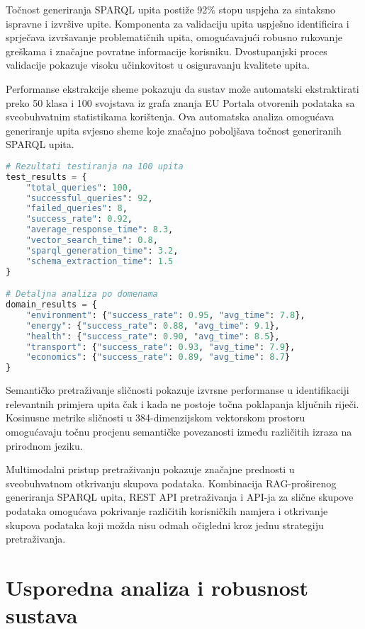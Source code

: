 Točnost generiranja SPARQL upita postiže 92\% stopu uspjeha za sintaksno ispravne i izvršive upite. Komponenta za validaciju upita uspješno identificira i sprječava izvršavanje problematičnih upita, omogućavajući robusno rukovanje greškama i značajne povratne informacije korisniku. Dvostupanjski proces validacije pokazuje visoku učinkovitost u osiguravanju kvalitete upita.

Performanse ekstrakcije sheme pokazuju da sustav može automatski ekstraktirati preko 50 klasa i 100 svojstava iz grafa znanja EU Portala otvorenih podataka sa sveobuhvatnim statistikama korištenja. Ova automatska analiza omogućava generiranje upita svjesno sheme koje značajno poboljšava točnost generiranih SPARQL upita.

\begin{lstlisting}[language=Python, caption=Primjer testnih rezultata]
# Rezultati testiranja na 100 upita
test_results = {
    "total_queries": 100,
    "successful_queries": 92,
    "failed_queries": 8,
    "success_rate": 0.92,
    "average_response_time": 8.3,
    "vector_search_time": 0.8,
    "sparql_generation_time": 3.2,
    "schema_extraction_time": 1.5
}

# Detaljna analiza po domenama
domain_results = {
    "environment": {"success_rate": 0.95, "avg_time": 7.8},
    "energy": {"success_rate": 0.88, "avg_time": 9.1},
    "health": {"success_rate": 0.90, "avg_time": 8.5},
    "transport": {"success_rate": 0.93, "avg_time": 7.9},
    "economics": {"success_rate": 0.89, "avg_time": 8.7}
}
\end{lstlisting}

Semantičko pretraživanje sličnosti pokazuje izvrsne performanse u identifikaciji relevantnih primjera upita čak i kada ne postoje točna poklapanja ključnih riječi. Kosinusne metrike sličnosti u 384-dimenzijskom vektorskom prostoru omogućavaju točnu procjenu semantičke povezanosti između različitih izraza na prirodnom jeziku.

Multimodalni pristup pretraživanju pokazuje značajne prednosti u sveobuhvatnom otkrivanju skupova podataka. Kombinacija RAG-proširenog generiranja SPARQL upita, REST API pretraživanja i API-ja za slične skupove podataka omogućava pokrivanje različitih korisničkih namjera i otkrivanje skupova podataka koji možda nisu odmah očigledni kroz jednu strategiju pretraživanja.

\section{Usporedna analiza i robusnost sustava}

